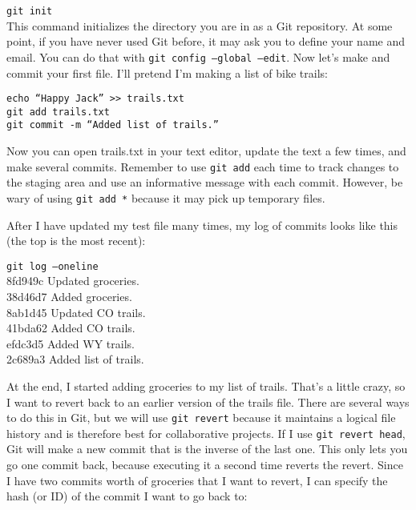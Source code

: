 \documentclass[12pt, letterpaper]{article}
\newcommand{\code}{\texttt}
\begin{document}
\noindent\code{git init} \\

This command initializes the directory you are in as a Git repository.  At some point, if you have never used Git before, it may ask you to define your name and email.  You can do that with \code{git config --global --edit}.  Now let's make and commit your first file.  I'll pretend I'm making a list of bike trails:

\begin{flushleft}
\code{echo ``Happy Jack'' >> trails.txt \\
git add trails.txt \\
git commit -m ``Added list of trails.''}
\end{flushleft}

Now you can open trails.txt in your text editor, update the text a few times, and make several commits.  Remember to use \code{git add} each time to track changes to the staging area and use an informative message with each commit.  However, be wary of using \code{git add *} because it may pick up temporary files.

After I have updated my test file many times, my log of commits looks like this (the top is the most recent):

\begin{flushleft}
\code{git log --oneline} \\
8fd949c Updated groceries. \\
38d46d7 Added groceries. \\
8ab1d45 Updated CO trails.\\
41bda62 Added CO trails.\\
efdc3d5 Added WY trails.\\
2c689a3 Added list of trails.\\
\end{flushleft}

At the end, I started adding groceries to my list of trails.  That's a little crazy, so I want to revert back to an earlier version of the trails file.  There are several ways to do this in Git, but we will use \code{git revert} because it maintains a logical file history and is therefore best for collaborative projects.  If I use \code{git revert head}, Git will make a new commit that is the inverse of the last one.  This only lets you go one commit back, because executing it a second time reverts the revert.  Since I have two commits worth of groceries that I want to revert, I can specify the hash (or ID) of the commit I want to go back to:
\end{document}

